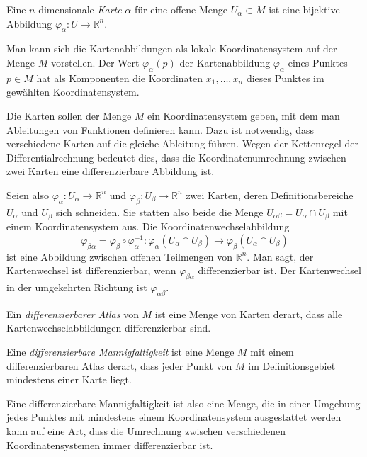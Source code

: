 \begin{definition}
Eine $n$-dimensionale {\em Karte} $\alpha$ für eine offene Menge
$U_\alpha\subset M$ ist eine bijektive Abbildung
$\varphi_\alpha\colon U\to \mathbb{R}^n$.
\end{definition}

Man kann sich die Kartenabbildungen als lokale Koordinatensystem auf der
Menge $M$ vorstellen.
Der Wert $\varphi_\alpha(p)$ der Kartenabbildung $\varphi_\alpha$
eines Punktes $p\in M$ hat als Komponenten die Koordinaten $x_1,\dots,x_n$
dieses Punktes im gewählten Koordinatensystem.

Die Karten sollen der Menge $M$ ein Koordinatensystem geben, mit dem
man Ableitungen von Funktionen definieren kann.
Dazu ist notwendig, dass verschiedene Karten auf die gleiche
Ableitung führen.
Wegen der Kettenregel der Differentialrechnung bedeutet dies, dass
die Koordinatenumrechnung zwischen zwei Karten eine differenzierbare
Abbildung ist.

Seien also
$\varphi_\alpha\colon U_\alpha \to \mathbb{R}^n$
und
$\varphi_\beta\colon U_\beta \to \mathbb{R}^n$
zwei Karten, deren Definitionsbereiche $U_\alpha$ und $U_\beta$ sich
schneiden.
Sie statten also beide die Menge $U_{\alpha\beta}=U_\alpha\cap U_\beta$
mit einem Koordinatensystem aus.
Die Koordinatenwechselabbildung
\[
\varphi_{\beta\alpha}
=
\varphi_\beta
\circ
\varphi_\alpha^{-1}
\colon
\varphi_\alpha(U_\alpha\cap U_\beta)
\to
\varphi_\beta(U_\alpha\cap U_\beta)
\]
ist eine Abbildung zwischen offenen Teilmengen von $\mathbb{R}^n$.
Man sagt, der Kartenwechsel ist differenzierbar, wenn $\varphi_{\beta\alpha}$
differenzierbar ist.
Der Kartenwechsel in der umgekehrten Richtung ist $\varphi_{\alpha\beta}$.

\begin{definition}
Ein {\em differenzierbarer Atlas} von $M$ ist eine Menge von Karten derart,
dass alle Kartenwechselabbildungen differenzierbar sind.
\end{definition}

\begin{definition}
Eine {\em differenzierbare Mannigfaltigkeit} ist eine Menge $M$ mit einem
differenzierbaren Atlas derart, dass jeder Punkt von $M$ im
Definitionsgebiet mindestens einer Karte liegt.
\end{definition}

Eine differenzierbare Mannigfaltigkeit ist also eine Menge, die in
einer Umgebung jedes Punktes mit mindestens einem Koordinatensystem
ausgestattet werden kann auf eine Art, dass die Umrechnung zwischen
verschiedenen Koordinatensystemen immer differenzierbar ist.

